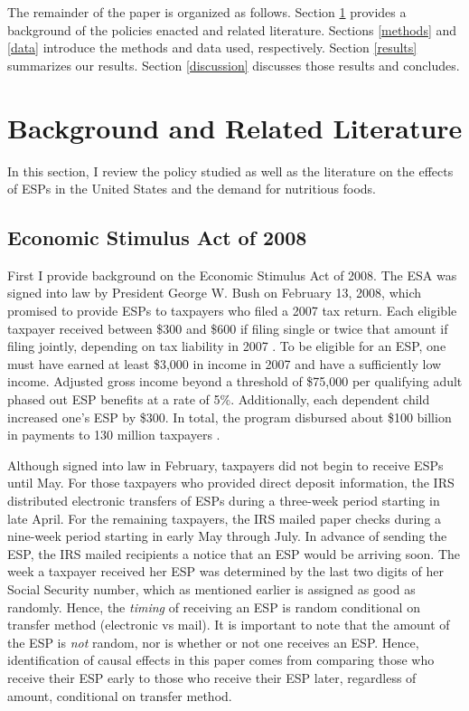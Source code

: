 \documentclass[12pt]{article}
\begin{document}
The remainder of the paper is organized as follows.
Section \ref{background} provides a background of the policies enacted and related literature.
Sections \ref{methods} and \ref{data} introduce the methods and data used, respectively.
Section \ref{results} summarizes our results.
Section \ref{discussion} discusses those results and concludes.

\section{Background and Related Literature} \label{background}

In this section, I review the policy studied as well as the literature on the effects of ESPs in the United States and the demand for nutritious foods.

\subsection{Economic Stimulus Act of 2008} \label{2008esa}

First I provide background on the Economic Stimulus Act of 2008.
The ESA was signed into law by President George W.
Bush on February 13, 2008, which promised to provide ESPs to taxpayers who filed a 2007 tax return.
Each eligible taxpayer received between \$300 and \$600 if filing single or twice that amount if filing jointly, depending on tax liability in 2007 \parencite{house2008}.
To be eligible for an ESP, one must have earned at least \$3,000 in income in 2007 and have a sufficiently low income.
Adjusted gross income beyond a threshold of \$75,000 per qualifying adult phased out ESP benefits at a rate of 5\%.
Additionally, each dependent child increased one's ESP by \$300.
In total, the program disbursed about \$100 billion in payments to 130 million taxpayers \parencite{parker2013consumer}.

Although signed into law in February, taxpayers did not begin to receive ESPs until May.
For those taxpayers who provided direct deposit information, the IRS distributed electronic transfers of ESPs during a three-week period starting in late April.
For the remaining taxpayers, the IRS mailed paper checks during a nine-week period starting in early May through July.
In advance of sending the ESP, the IRS mailed recipients a notice that an ESP would be arriving soon.
The week a taxpayer received her ESP was determined by the last two digits of her Social Security number, which as mentioned earlier is assigned as good as randomly.
Hence, the \textit{timing} of receiving an ESP is random conditional on transfer method (electronic vs mail).
It is important to note that the amount of the ESP is \textit{not} random, nor is whether or not one receives an ESP.
Hence, identification of causal effects in this paper comes from comparing those who receive their ESP early to those who receive their ESP later, regardless of amount, conditional on transfer method.
\end{document}
